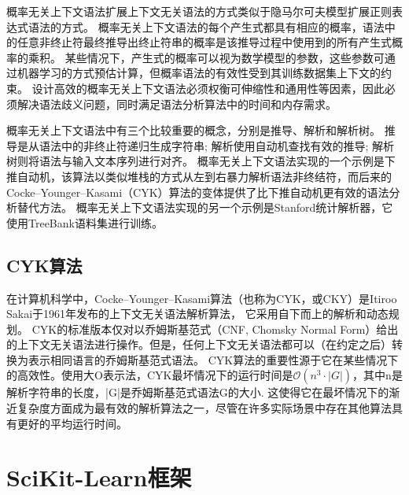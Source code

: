 概率无关上下文语法扩展上下文无关语法的方式类似于隐马尔可夫模型扩展正则表达式语法的方式。
概率无关上下文语法的每个产生式都具有相应的概率，语法中的任意非终止符最终推导出终止符串的概率是该推导过程中使用到的所有产生式概率的乘积。
某些情况下，产生式的概率可以视为数学模型的参数，这些参数可通过机器学习的方式预估计算，但概率语法的有效性受到其训练数据集上下文的约束。
设计高效的概率无关上下文语法必须权衡可伸缩性和通用性等因素，因此必须解决语法歧义问题，同时满足语法分析算法中的时间和内存需求。

概率无关上下文语法中有三个比较重要的概念，分别是推导、解析和解析树。
推导是从语法中的非终止符递归生成字符串; 解析使用自动机查找有效的推导; 解析树则将语法与输入文本序列进行对齐。
概率无关上下文语法实现的一个示例是下推自动机\cite{sippl1999biological}，该算法以类似堆栈的方式从左到右暴力解析语法非终结符，而后来的Cocke–Younger–Kasami（CYK）算法的变体提供了比下推自动机更有效的语法分析替代方法。
概率无关上下文语法实现的另一个示例是Stanford统计解析器\cite{klein2003accurate}，它使用TreeBank语料集进行训练。

\subsection{CYK算法}

在计算机科学中，Cocke–Younger–Kasami算法（也称为CYK，或CKY）是Itiroo Sakai\cite{mey1965international}于1961年发布的上下文无关语法解析算法，
它采用自下而上的解析和动态规划。
CYK的标准版本仅对以乔姆斯基范式（CNF, Chomsky Normal Form）给出的上下文无关语法进行操作。但是，任何上下文无关语法都可以（在约定之后）转换为表示相同语言的乔姆斯基范式语法。
CYK算法的重要性源于它在某些情况下的高效性。使用大O表示法，CYK最坏情况下的运行时间是$\displaystyle \mathcal{O} (n^{3} \cdot |G|)$，其中n是解析字符串的长度，|G|是乔姆斯基范式语法G的大小.
这使得它在最坏情况下的渐近复杂度方面成为最有效的解析算法之一，尽管在许多实际场景中存在其他算法具有更好的平均运行时间\cite{sipser1997context}。

\section{SciKit-Learn框架}

